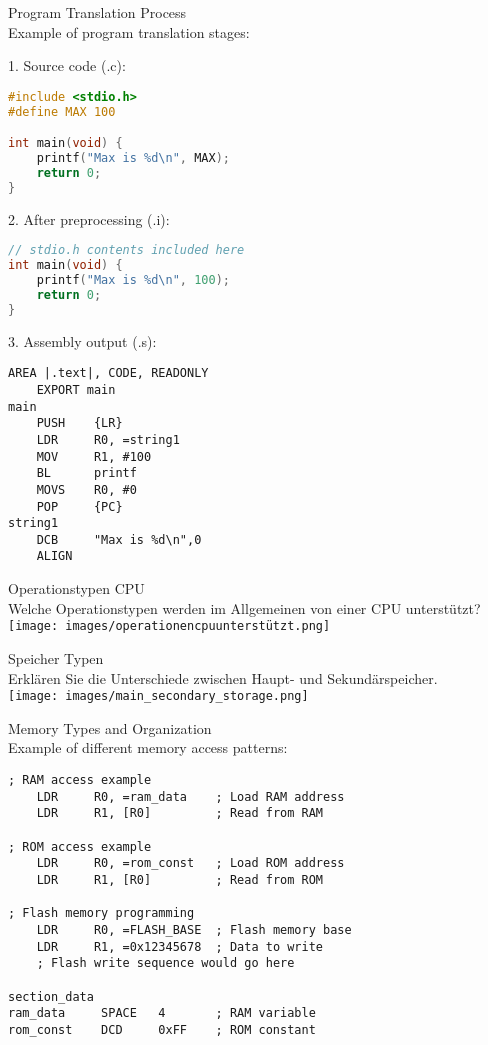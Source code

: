 \begin{example2}{Program Translation Process}\\
Example of program translation stages:

1. Source code (.c):
\begin{lstlisting}[language=C, style=basesmol]
#include <stdio.h>
#define MAX 100

int main(void) {
    printf("Max is %d\n", MAX);
    return 0;
}
\end{lstlisting}

2. After preprocessing (.i):
\begin{lstlisting}[language=C, style=basesmol]
// stdio.h contents included here
int main(void) {
    printf("Max is %d\n", 100);
    return 0;
}
\end{lstlisting}

3. Assembly output (.s):
\begin{lstlisting}[language=armasm, style=basesmol]
    AREA |.text|, CODE, READONLY
    EXPORT main
main
    PUSH    {LR}
    LDR     R0, =string1
    MOV     R1, #100
    BL      printf
    MOVS    R0, #0
    POP     {PC}
string1
    DCB     "Max is %d\n",0
    ALIGN
\end{lstlisting}
\end{example2}

\begin{example2}{Operationstypen CPU}\\
Welche Operationstypen werden im Allgemeinen von einer CPU unterstützt?\\
\texttt{[image: images/operationencpuunterstützt.png]}
\end{example2}

\begin{example2}{Speicher Typen}\\
Erklären Sie die Unterschiede zwischen Haupt- und Sekundärspeicher.\\
\texttt{[image: images/main\_secondary\_storage.png]}
\end{example2}

\begin{example2}{Memory Types and Organization}\\
Example of different memory access patterns:

\begin{lstlisting}[language=armasm, style=basesmol]
; RAM access example
    LDR     R0, =ram_data    ; Load RAM address
    LDR     R1, [R0]         ; Read from RAM
    
; ROM access example
    LDR     R0, =rom_const   ; Load ROM address
    LDR     R1, [R0]         ; Read from ROM
    
; Flash memory programming
    LDR     R0, =FLASH_BASE  ; Flash memory base
    LDR     R1, =0x12345678  ; Data to write
    ; Flash write sequence would go here
    
section_data
ram_data     SPACE   4       ; RAM variable
rom_const    DCD     0xFF    ; ROM constant
\end{lstlisting}
\end{example2}

